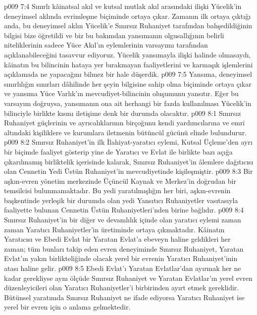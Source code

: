 \vs p009 7:4 Sınırlı kâinatsal akıl ve kutsal mutlak akıl arasındaki ilişki Yücelik’in deneyimsel aklında evrimleşme biçiminde ortaya çıkar. Zamanın ilk ortaya çıktığı anda, bu deneyimsel aklın Yücelik’e Sınırsız Ruhaniyet tarafından bahşedildiğinin bilgisi bize öğretildi ve biz bu bakımdan yansımanın olgusallığının belirli niteliklerinin sadece Yüce Akıl’ın eylemlerinin varsayımı tarafından açıklanabileceğini tasavvur ediyoruz. Yücelik yansımayla ilişki halinde olmasaydı, kâinatın bu bilincinin hataya yer bırakmayan faaliyetlerini ve karmaşık işlemlerini açıklamada ne yapacağını bilmez bir hale düşerdik.
\vs p009 7:5 Yansıma, deneyimsel sınırlılığın sınırları dâhilinde her şeyin bilgisine sahip olma biçiminde ortaya çıkar ve yansıma Yüce Varlık’ın mevcudiyet\hyp{}bilincinin oluşumunu yansıtır. Eğer bu varsayım doğruysa, yansımanın ona ait herhangi bir fazda kullanılması Yücelik’in bilinciyle birlikte kısmı iletişime denk bir durumda olacaktır.
\vs p009 8:1 Sınırsız Ruhaniyet güçlerinin ve ayrıcalıklarının birçoğunu kendi yardımcılarına ve emri altındaki kişiliklere ve kurumlara iletmenin bütüncül gücünü elinde bulundurur.
\vs p009 8:2 Sınırsız Ruhaniyet’in ilk İlahiyat\hyp{}yaratıcı eylemi, Kutsal Üçleme’den ayrı bir biçimde faaliyet gösterip yine de Yaratıcı ve Evlat ile birlikte bazı açığa çıkarılmamış birliktelik içerisinde kalarak, Sınırsız Ruhaniyet’in âlemlere dağıtıcısı olan Cennetin Yedi Üstün Ruhaniyet’in mevcudiyetinde kişileşmiştir.
\vs p009 8:3 Bir aşkın\hyp{}evren yönetim merkezinde Üçüncül Kaynak ve Merkez’in doğrudan bir temsilcisi bulunmamaktadır. Bu yedi yaratılmışlığın her biri, aşkın\hyp{}evrenin başkentinde yerleşik bir durumda olan yedi Yansıtıcı Ruhaniyetler vasıtasıyla faaliyette bulunan Cennetin Üstün Ruhaniyetleri’nden birine bağlıdır.
\vs p009 8:4 Sınırsız Ruhaniyet’in bir diğer ve devamlılık içinde olan yaratıcı eylemi zaman zaman Yaratıcı Ruhaniyetler’in üretiminde ortaya çıkmaktadır. Kâinatın Yaratıcısı ve Ebedi Evlat bir Yaratan Evlat’a ebeveyn haline geldikleri her zaman; tüm bunları takip eden evren deneyiminde Sınırsız Ruhaniyet, Yaratan Evlat’ın yakın birlikteliğinde olacak yerel bir evrenin Yaratıcı Ruhaniyet’inin atası haline gelir.
\vs p009 8:5 Ebedi Evlat’ı Yaratan Evlatlar’dan ayırmak her ne kadar gerekliyse aynı ölçüde Sınırsız Ruhaniyet ve Yaratan Evlatlar’ın yerel evren düzenleyicileri olan Yaratıcı Ruhaniyetler’i birbirinden ayırt etmek gereklidir. Bütünsel yaratımda Sınırsız Ruhaniyet ne ifade ediyorsa Yaratıcı Ruhaniyet ise yerel bir evren için o anlama gelmektedir.
